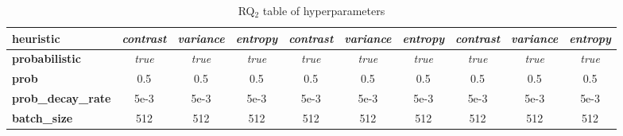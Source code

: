 \begin{table}[!htp]
\begin{tabular}{|l|ccc|ccc|ccc|}
\textbf{heuristic}         & \textit{contrast}             & \textit{variance}                    & \textit{entropy}              & \textit{contrast}             & \textit{variance}                    & \textit{entropy}              & \textit{contrast}             & \textit{variance}                     & \textit{entropy}              \\ \hline
\textbf{probabilistic}     & \textit{true}                 & \textit{true}                        & \textit{true}                 & \textit{true}                 & \textit{true}                        & \textit{true}                 & \textit{true}                 & \textit{true}                         & \textit{true}                 \\ \hline
\textbf{prob}              & 0.5                           & 0.5                                  & 0.5                           & 0.5                           & 0.5                                  & 0.5                           & 0.5                           & 0.5                                   & 0.5                           \\ \hline
\textbf{prob\_decay\_rate} & 5e-3                          & 5e-3                                 & 5e-3                          & 5e-3                          & 5e-3                                 & 5e-3                          & 5e-3                          & 5e-3                                  & 5e-3                          \\ \hline
\textbf{batch\_size}       & 512                           & 512                                  & 512                           & 512                           & 512                                  & 512                           & 512                           & 512                                   & 512                           \\ \hline
\end{tabular}
\caption{RQ$_{2}$ table of hyperparameters}
\label{tab:hyperparameters}
\end{table}
